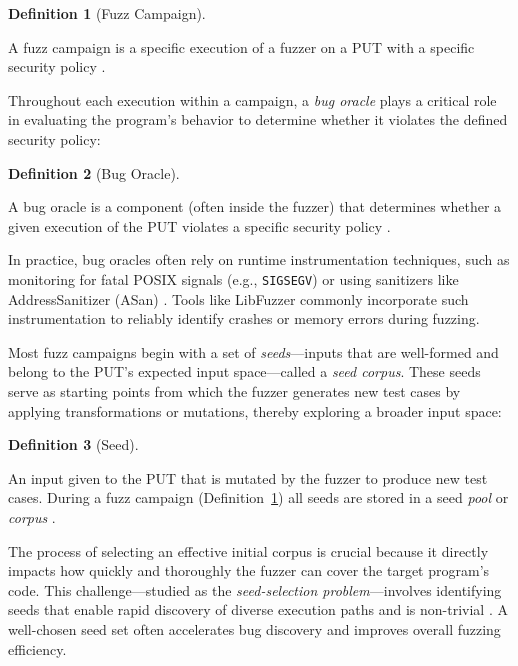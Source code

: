 \documentclass[
  a4paper,
]{scrreprt}
\theoremstyle{definition}
\newtheorem{definition}{Definition}[chapter]
\theoremstyle{remark}
\begin{document}
\begin{definition}[Fuzz
Campaign]\protect\hypertarget{def-campaign}{}\label{def-campaign}

A fuzz campaign is a specific execution of a fuzzer on a PUT with a
specific security policy \autocite{manes2019}.

\end{definition}

Throughout each execution within a campaign, a \emph{bug oracle} plays a
critical role in evaluating the program's behavior to determine whether
it violates the defined security policy:

\begin{definition}[Bug
Oracle]\protect\hypertarget{def-oracle}{}\label{def-oracle}

A bug oracle is a component (often inside the fuzzer) that determines
whether a given execution of the PUT violates a specific security policy
\autocite{manes2019}.

\end{definition}

In practice, bug oracles often rely on runtime instrumentation
techniques, such as monitoring for fatal POSIX signals (e.g.,
\texttt{SIGSEGV}) or using sanitizers like AddressSanitizer (ASan)
\autocite{serebryany2012}. Tools like LibFuzzer \autocite{libfuzzer}
commonly incorporate such instrumentation to reliably identify crashes
or memory errors during fuzzing.

Most fuzz campaigns begin with a set of \emph{seeds}---inputs that are
well-formed and belong to the PUT's expected input space---called a
\emph{seed corpus}. These seeds serve as starting points from which the
fuzzer generates new test cases by applying transformations or
mutations, thereby exploring a broader input space:

\begin{definition}[Seed]\protect\hypertarget{def-seed}{}\label{def-seed}

An input given to the PUT that is mutated by the fuzzer to produce new
test cases. During a fuzz campaign (Definition~\ref{def-campaign}) all
seeds are stored in a seed \emph{pool} or \emph{corpus}
\autocite{manes2019}.

\end{definition}

The process of selecting an effective initial corpus is crucial because
it directly impacts how quickly and thoroughly the fuzzer can cover the
target program's code. This challenge---studied as the
\emph{seed-selection problem}---involves identifying seeds that enable
rapid discovery of diverse execution paths and is non-trivial
\autocite{rebert2014}. A well-chosen seed set often accelerates bug
discovery and improves overall fuzzing efficiency.
\end{document}
